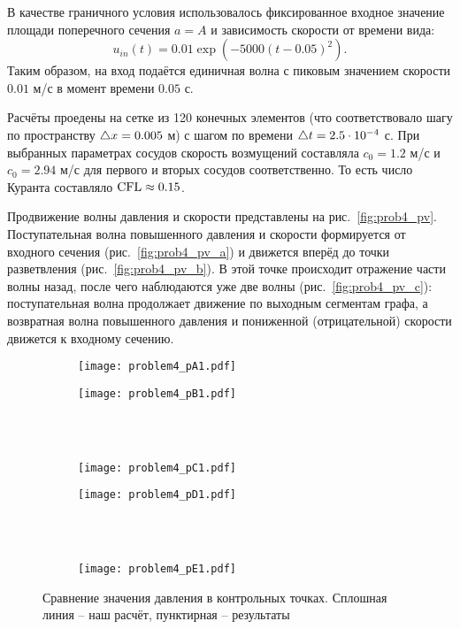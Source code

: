 В качестве граничного условия использовалось фиксированное входное значение
площади поперечного сечения $a = A$ и зависимость скорости от времени вида:
\begin{equation}
\nonumber
u_{in}(t) = 0.01\exp\left(-5000(t-0.05)^2\right).
\end{equation}
Таким образом, на вход подаётся единичная волна с пиковым
значением скорости $0.01$ м/с в момент времени $0.05$ с.

Расчёты проедены на сетке из 120 конечных элементов
(что соответствовало шагу по пространству $\triangle x = 0.005$ м)
с шагом по времени $\triangle t = 2.5\cdot10^{-4}$ с.
При выбранных параметрах сосудов скорость возмущений 
составляла $c_0=1.2$ м/с и $c_0 = 2.94$ м/с
для первого и вторых сосудов соответственно.
То есть число Куранта составляло $\mathrm{CFL}\approx0.15$.


Продвижение волны давления и скорости представлены на рис.~\ref{fig:prob4_pv}.
Поступательная волна повышенного давления и скорости
формируется от входного сечения (рис.~\ref{fig:prob4_pv_a})
и движется вперёд до точки разветвления (рис.~\ref{fig:prob4_pv_b}).
В этой точке происходит отражение части волны назад, после чего
наблюдаются уже две волны (рис.~\ref{fig:prob4_pv_c}):
поступательная волна продолжает движение по выходным сегментам графа,
а возвратная волна повышенного давления и пониженной (отрицательной)
скорости движется к входному сечению.

\begin{figure}[h!]
\begin{subfigure}{0.5\linewidth}\centering
\texttt{[image: problem4\_pA1.pdf]}
\end{subfigure}%
\begin{subfigure}{0.5\linewidth}\centering
\texttt{[image: problem4\_pB1.pdf]}
\end{subfigure} \\
\hfill \\
\begin{subfigure}{0.5\linewidth}\centering
\texttt{[image: problem4\_pC1.pdf]}
\end{subfigure}%
\begin{subfigure}{0.5\linewidth}\centering
\texttt{[image: problem4\_pD1.pdf]}
\end{subfigure}\\
\hfill \\
\begin{subfigure}{0.5\linewidth}\centering
\texttt{[image: problem4\_pE1.pdf]}
\end{subfigure}%
\caption{Сравнение значения давления в контрольных точках. Сплошная линия -- наш расчёт, пунктирная -- результаты~\cite{Xiu:2007}}\label{fig:prob4_pt}
\end{figure}


